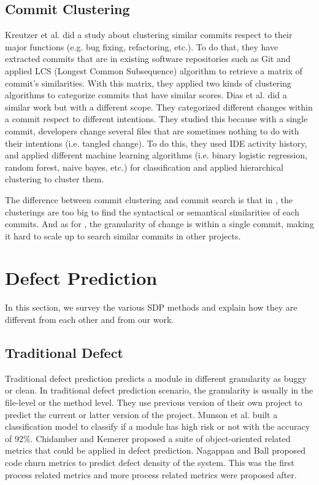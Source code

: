 \subsection{Commit Clustering}
Kreutzer et al. \cite{kreutzer2016automatic} did a study about clustering similar commits respect to their major functions (e.g. bug fixing, refactoring, etc.).
To do that, they have extracted commits that are in existing software repositories such as Git and applied LCS (Longest Common Subsequence) algorithm to retrieve a matrix of commit's similarities.
With this matrix, they applied two kinds of clustering algorithms to categorize commits that have similar scores.
Dias et al. \cite{dias2015untangling} did a similar work but with a different scope.
They categorized different changes within a commit respect to different intentions.
They studied this because with a single commit, developers change several files that are sometimes nothing to do with their intentions (i.e. tangled change).
To do this, they used IDE activity history, and applied different machine learning algorithms (i.e. binary logistic regression, random forest, naive bayes, etc.) for classification and applied hierarchical clustering to cluster them.

The difference between commit clustering and commit search is that in \cite{kreutzer2016automatic}, the clusterings are too big to find the syntactical or semantical similarities of each commits. And as for \cite{dias2015untangling}, the granularity of change is within a single commit, making it hard to scale up to search similar commits in other projects.

\section{Defect Prediction}
In this section, we survey the various SDP methods and explain how they are different from each other and from our work.

\subsection{Traditional Defect}
Traditional defect prediction predicts a module in different granularity as buggy or clean.
In traditional defect prediction scenario, the granularity is usually in the file-level or the method level.
They use previous version of their own project to predict the current or latter version of the project.
Munson et al. \cite{munson1992detection} built a classification model to classify if a module has high risk or not with the accuracy of 92\%.
Chidamber and Kemerer \cite{chidamber1994metrics} proposed a suite of object-oriented related metrics that could be applied in defect prediction.
Nagappan and Ball \cite{nagappan2005use} proposed code churn metrics to predict defect density of the system.
This was the first process related metrics and more process related metrics were proposed after.

